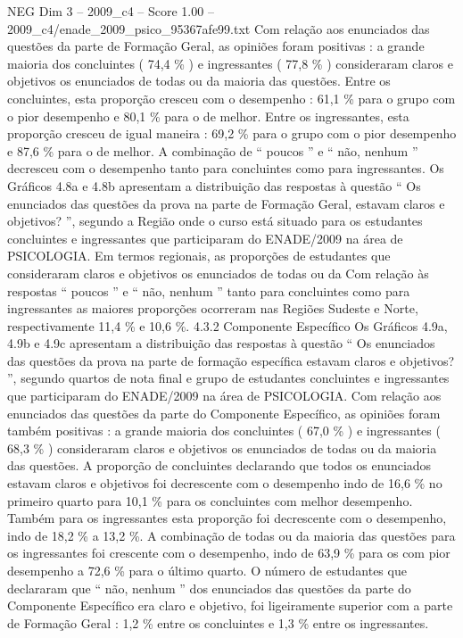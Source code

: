 \begin{textsample}{NEG Dim 3 – 2009\_c4 – Score 1.00 – 2009\_c4/enade\_2009\_psico\_95367afe99.txt}
Com relação aos enunciados das questões da parte de Formação Geral, as opiniões foram positivas : a grande maioria dos concluintes ( 74,4 \% ) e ingressantes ( 77,8 \% ) consideraram claros e objetivos os enunciados de todas ou da maioria das questões.
Entre os concluintes, esta proporção cresceu com o desempenho : 61,1 \% para o grupo com o pior desempenho e 80,1 \% para o de melhor.
Entre os ingressantes, esta proporção cresceu de igual maneira : 69,2 \% para o grupo com o pior desempenho e 87,6 \% para o de melhor.
A combinação de “ poucos ” e “ não, nenhum ” decresceu com o desempenho tanto para concluintes como para ingressantes.
Os Gráficos 4.8a e 4.8b apresentam a distribuição das respostas à questão “ Os enunciados das questões da prova na parte de Formação Geral, estavam claros e objetivos? ”, segundo a Região onde o curso está situado para os estudantes concluintes e ingressantes que participaram do ENADE/2009 na área de PSICOLOGIA.
Em termos regionais, as proporções de estudantes que consideraram claros e objetivos os enunciados de todas ou da Com relação às respostas “ poucos ” e “ não, nenhum ” tanto para concluintes como para ingressantes as maiores proporções ocorreram nas Regiões Sudeste e Norte, respectivamente 11,4 \% e 10,6 \%. 4.3.2 Componente Específico Os Gráficos 4.9a, 4.9b e 4.9c apresentam a distribuição das respostas à questão “ Os enunciados das questões da prova na parte de formação específica estavam claros e objetivos? ”, segundo quartos de nota final e grupo de estudantes concluintes e ingressantes que participaram do ENADE/2009 na área de PSICOLOGIA.
Com relação aos enunciados das questões da parte do Componente Específico, as opiniões foram também positivas : a grande maioria dos concluintes ( 67,0 \% ) e ingressantes ( 68,3 \% ) consideraram claros e objetivos os enunciados de todas ou da maioria das questões.
A proporção de concluintes declarando que todos os enunciados estavam claros e objetivos foi decrescente com o desempenho indo de 16,6 \% no primeiro quarto para 10,1 \% para os concluintes com melhor desempenho.
Também para os ingressantes esta proporção foi decrescente com o desempenho, indo de 18,2 \% a 13,2 \%.
A combinação de todas ou da maioria das questões para os ingressantes foi crescente com o desempenho, indo de 63,9 \% para os com pior desempenho a 72,6 \% para o último quarto.
O número de estudantes que declararam que “ não, nenhum ” dos enunciados das questões da parte do Componente Específico era claro e objetivo, foi ligeiramente superior com a parte de Formação Geral : 1,2 \% entre os concluintes e 1,3 \% entre os ingressantes.

\end{textsample}
